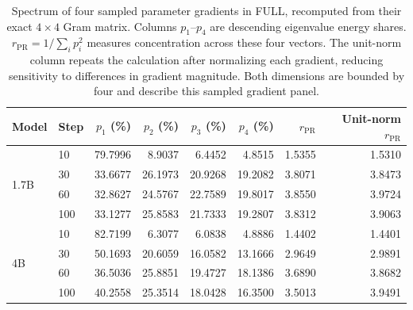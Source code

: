 \begin{table}[!htbp]
\centering
\caption{Spectrum of four sampled parameter gradients in FULL, recomputed from their exact $4\times4$ Gram matrix. Columns $p_1$--$p_4$ are descending eigenvalue energy shares. $r_{\mathrm{PR}}=1/\sum_i p_i^2$ measures concentration across these four vectors. The unit-norm column repeats the calculation after normalizing each gradient, reducing sensitivity to differences in gradient magnitude. Both dimensions are bounded by four and describe this sampled gradient panel.}
\label{tab:parameter_gradient_spectrum}
\small\setlength{\tabcolsep}{5pt}
\begin{tabular}{llrrrrrr}
\toprule
Model & Step & $p_1$ (\%) & $p_2$ (\%) & $p_3$ (\%) & $p_4$ (\%) & $r_{\mathrm{PR}}$ & Unit-norm $r_{\mathrm{PR}}$ \\
\midrule
\multirow{4}{*}{1.7B} & 10 & 79.7996 & 8.9037 & 6.4452 & 4.8515 & 1.5355 & 1.5310 \\
 & 30 & 33.6677 & 26.1973 & 20.9268 & 19.2082 & 3.8071 & 3.8473 \\
 & 60 & 32.8627 & 24.5767 & 22.7589 & 19.8017 & 3.8550 & 3.9724 \\
 & 100 & 33.1277 & 25.8583 & 21.7333 & 19.2807 & 3.8312 & 3.9063 \\
\midrule
\multirow{4}{*}{4B} & 10 & 82.7199 & 6.3077 & 6.0838 & 4.8886 & 1.4402 & 1.4401 \\
 & 30 & 50.1693 & 20.6059 & 16.0582 & 13.1666 & 2.9649 & 2.9891 \\
 & 60 & 36.5036 & 25.8851 & 19.4727 & 18.1386 & 3.6890 & 3.8682 \\
 & 100 & 40.2558 & 25.3514 & 18.0428 & 16.3500 & 3.5013 & 3.9491 \\
\bottomrule
\end{tabular}
\end{table}

